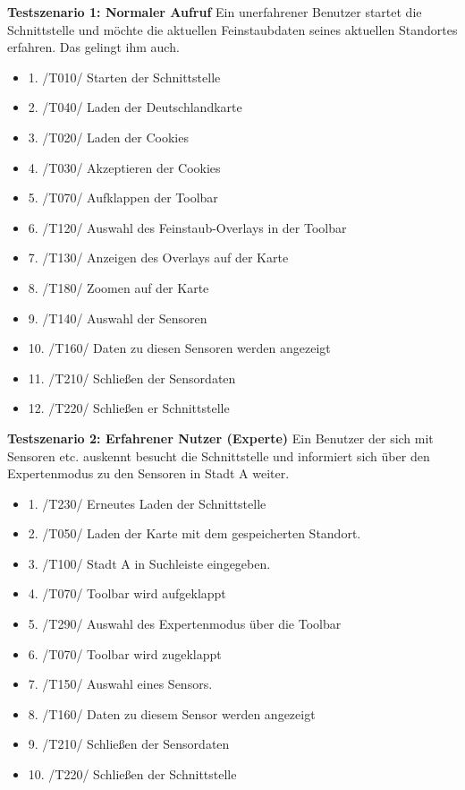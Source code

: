 \textbf{Testszenario 1: Normaler Aufruf}
\newline
Ein unerfahrener Benutzer startet die Schnittstelle und möchte die aktuellen Feinstaubdaten seines aktuellen Standortes erfahren. Das gelingt ihm auch.
\begin{itemize} [noitemsep]
    \item 1. /T010/ Starten der Schnittstelle
    \item 2. /T040/ Laden der Deutschlandkarte
    \item 3. /T020/ Laden der Cookies
    \item 4. /T030/ Akzeptieren der Cookies
    \item 5. /T070/ Aufklappen der Toolbar
    \item 6. /T120/ Auswahl des Feinstaub-Overlays in der Toolbar
    \item 7. /T130/ Anzeigen des Overlays auf der Karte
    \item 8. /T180/ Zoomen auf der Karte
    \item 9. /T140/ Auswahl der Sensoren
    \item 10. /T160/ Daten zu diesen Sensoren werden angezeigt
    \item 11. /T210/ Schließen der Sensordaten
    \item 12. /T220/ Schließen er Schnittstelle
\end{itemize}

\textbf{Testszenario 2: Erfahrener Nutzer (Experte)}
\newline
Ein Benutzer der sich mit Sensoren etc. auskennt besucht die Schnittstelle und informiert sich über den Expertenmodus zu den Sensoren in Stadt A weiter.
\begin{itemize} [noitemsep]
    \item 1. /T230/ Erneutes Laden der Schnittstelle
    \item 2. /T050/ Laden der Karte mit dem gespeicherten Standort.
    \item 3. /T100/ Stadt A in Suchleiste eingegeben.
    \item 4. /T070/ Toolbar wird aufgeklappt
    \item 5. /T290/ Auswahl des Expertenmodus über die Toolbar
    \item 6. /T070/ Toolbar wird zugeklappt
    \item 7. /T150/ Auswahl eines Sensors.
    \item 8. /T160/ Daten zu diesem Sensor werden angezeigt
    \item 9. /T210/ Schließen der Sensordaten
    \item 10. /T220/ Schließen der Schnittstelle
\end{itemize}

